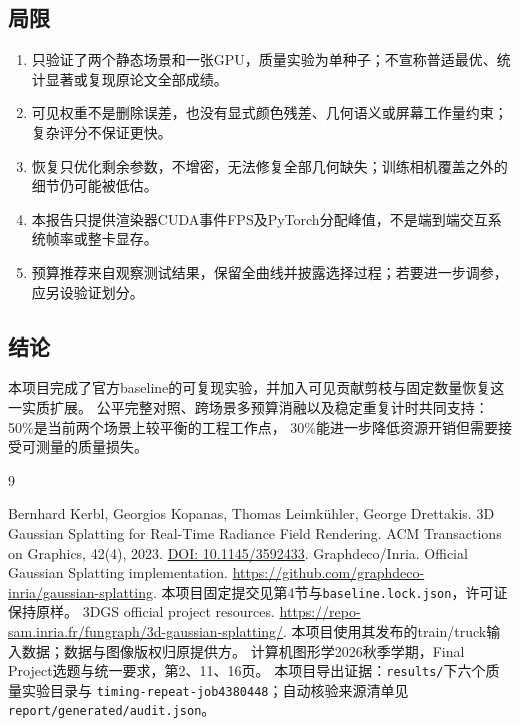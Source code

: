 \documentclass[UTF8,fontset=fandol,zihao=-4,a4paper]{ctexart}
\begin{document}
\subsection{局限}
\begin{enumerate}
\item 只验证了两个静态场景和一张GPU，质量实验为单种子；不宣称普适最优、统计显著或复现原论文全部成绩。
\item 可见权重不是删除误差，也没有显式颜色残差、几何语义或屏幕工作量约束；复杂评分不保证更快。
\item 恢复只优化剩余参数，不增密，无法修复全部几何缺失；训练相机覆盖之外的细节仍可能被低估。
\item 本报告只提供渲染器CUDA事件FPS及PyTorch分配峰值，不是端到端交互系统帧率或整卡显存。
\item 预算推荐来自观察测试结果，保留全曲线并披露选择过程；若要进一步调参，应另设验证划分。
\end{enumerate}

\subsection{结论}
本项目完成了官方baseline的可复现实验，并加入可见贡献剪枝与固定数量恢复这一实质扩展。
公平完整对照、跨场景多预算消融以及稳定重复计时共同支持：50\%是当前两个场景上较平衡的工程工作点，
30\%能进一步降低资源开销但需要接受可测量的质量损失。

\begin{thebibliography}{9}
\raggedright
{} Bernhard Kerbl, Georgios Kopanas, Thomas Leimkühler, George Drettakis.
3D Gaussian Splatting for Real-Time Radiance Field Rendering. ACM Transactions on Graphics, 42(4), 2023.
\href{https://doi.org/10.1145/3592433}{DOI: 10.1145/3592433}.
 Graphdeco/Inria. Official Gaussian Splatting implementation.
\url{https://github.com/graphdeco-inria/gaussian-splatting}. 本项目固定提交见第4节与\texttt{baseline.lock.json}，许可证保持原样。
 3DGS official project resources.
\url{https://repo-sam.inria.fr/fungraph/3d-gaussian-splatting/}.
本项目使用其发布的train/truck输入数据；数据与图像版权归原提供方。
 计算机图形学2026秋季学期，Final Project选题与统一要求，第2、11、16页。
 本项目导出证据：\texttt{results/}下六个质量实验目录与
\texttt{timing-repeat-job4380448}；自动核验来源清单见\texttt{report/generated/audit.json}。
\end{thebibliography}
\end{document}
